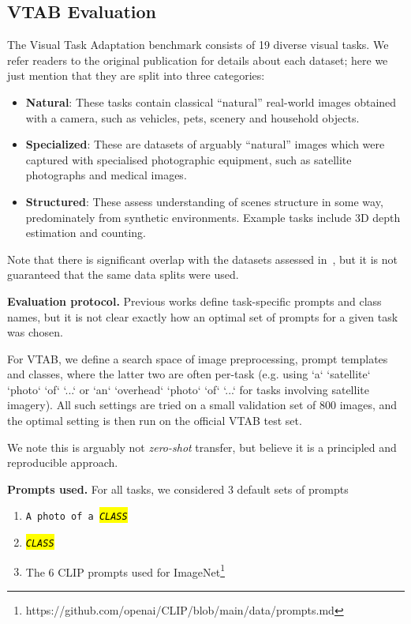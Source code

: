 \documentclass[10pt,twocolumn,letterpaper]{article}
\DeclareRobustCommand{\hlgrey}[1]{{\sethlcolor{light_gray}\hl{#1}}}
\newcommand{\clsfmt}[1]{\hlgrey{\textit{#1}}}
\def \cls {\clsfmt{CLASS}}
\begin{document}
\subsection{VTAB Evaluation}
\label{appendix:vtab}
The Visual Task Adaptation benchmark\cite{vtab} consists of 19 diverse visual tasks. We refer readers to the original publication for details about each dataset; here we just mention that they are split into three categories:
\begin{itemize}
    \item \textbf{Natural}: These tasks contain classical “natural” real-world images obtained with a camera, such as vehicles, pets, scenery and household objects.
    \item \textbf{Specialized}: These are datasets of arguably “natural” images which were captured with specialised photographic equipment, such as satellite photographs and medical images.
    \item \textbf{Structured}: These assess understanding of scenes structure in some way, predominately from synthetic environments. Example tasks include 3D depth estimation and counting.
\end{itemize}
Note that there is significant overlap with the datasets assessed in~\cite{clip}, but it is not guaranteed that the same data splits were used.

\textbf{Evaluation protocol.} 
Previous works\cite{clip} define task-specific prompts and class names, but it is not clear exactly how an optimal set of prompts for a given task was chosen.

For VTAB, we define a search space of image preprocessing, prompt templates and classes, where the latter two are often per-task (e.g. using `a` `satellite` `photo` `of` `...` or `an` `overhead` `photo` `of` `...` for tasks involving satellite imagery). All such settings are tried on a small validation set of 800 images, and the optimal setting is then run on the official VTAB test set.

We note this is arguably not \textit{zero-shot} transfer, but believe it is a principled and reproducible approach.

\textbf{Prompts used.}
For all tasks, we considered 3 default sets of prompts
\begin{enumerate}
\item \texttt{A photo of a \cls}
\item \texttt{\cls}
\item The 6 CLIP prompts used for ImageNet\footnote{https://github.com/openai/CLIP/blob/main/data/prompts.md}
\end{enumerate}
\end{document}
